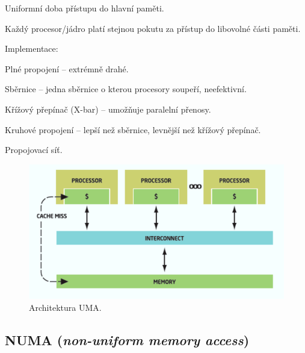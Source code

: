 \begin{compactitem}
    \item Uniformní doba přístupu do hlavní paměti. \begin{compactitem}
        \item Každý procesor/jádro platí stejnou pokutu za přístup do libovolné části paměti.
    \end{compactitem}

    \item Implementace: \begin{compactitem}
        \item Plné propojení -- extrémně drahé.
        \item Sběrnice -- jedna sběrnice o kterou procesory soupeří, neefektivní.
        \item Křížový přepínač (X-bar) -- umožňuje paralelní přenosy.
        \item Kruhové propojení -- lepší než sběrnice, levnější než křížový přepínač.
        \item Propojovací síť.
    \end{compactitem}

    \begin{figure}[H]
        \centering
        \includegraphics[width=0.9\linewidth]{uma.png}
        \caption{Architektura UMA.}
    \end{figure}
\end{compactitem}

\subsection{NUMA (\textit{non-uniform memory access})}

